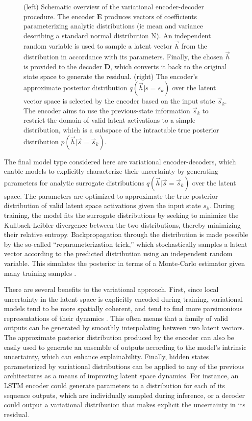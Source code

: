 \documentclass[11pt]{article}
\begin{document}
\begin{multicols}{2}
\begin{figure}[H]
        \caption{(left) Schematic overview of the variational encoder-decoder procedure. The encoder \textbf{E} produces vectors of coefficients parameterizing analytic distributions (ie mean and variance describing a standard normal distribution N). An independent random variable is used to sample a latent vector $\vec{h}$ from the distribution in accordance with its parameters. Finally, the chosen $\vec{h}$ is provided to the decoder \textbf{D}, which converts it back to the original state space to generate the residual. (right) The encoder's approximate posterior distribution $q(\vec{h}|s=s_k)$ over the latent vector space is selected by the encoder based on the input state $\vec{s}_k$. The encoder aims to use the previous-state information $\vec{s}_k$ to restrict the domain of valid latent activations to a simple distribution, which is a subspace of the intractable true posterior distribution $p(\vec{h}|\vec{s}=\vec{s}_k)$.}
        \label{ved}
    \end{figure}

    The final model type considered here are variational encoder-decoders, which enable models to explicitly characterize their uncertainty by generating parameters for analytic surrogate distributions $q(\vec{h}|\vec{s}=\vec{s}_k)$ over the latent space. The parameters are optimized to approximate the true posterior distribution of valid latent space activations given the input state $s_k$. During training, the model fits the surrogate distributions by seeking to minimize the Kullback-Leibler divergence between the two distributions, thereby minimizing their relative entropy. Backpropagation through the distribution is made possible by the so-called ``reparameterization trick,'' which stochastically samples a latent vector according to the predicted distribution using an independent random variable. This simulates the posterior in terms of a Monte-Carlo estimator given many training samples \cite{kingma_auto-encoding_2014}\cite{ganguly_amortized_2023}.

    There are several benefits to the variational approach. First, since local uncertainty in the latent space is explicitly encoded during training, variational models tend to be more spatially coherent, and tend to find more parsimonious representations of their dynamics \cite{lopez_gd-vaes_2022}\cite{kutz_parsimony_2022}. This often means that a family of valid outputs can be generated by smoothly interpolating between two latent vectors. The approximate posterior distribution produced by the encoder can also be easily used to generate an ensemble of outputs according to the model's intrinsic uncertainty, which can enhance explainability. Finally, hidden states parameterized by variational distributions can be applied to any of the previous architectures as a means of improving latent space dynamics. For instance, an LSTM encoder could generate parameters to a distribution for each of its sequence outputs, which are individually sampled during inference, or a decoder could output a variational distribution that makes explicit the uncertainty in its residual.


\end{multicols}
\end{document}
